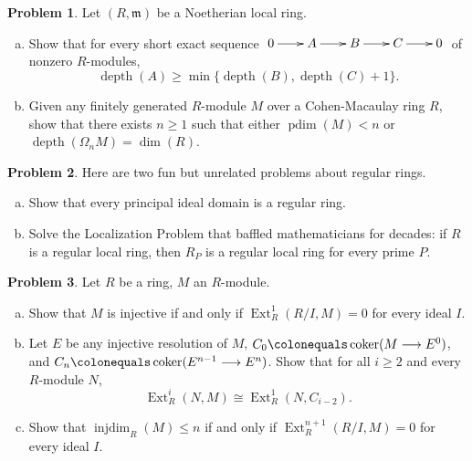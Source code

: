 \documentclass[11pt]{article}
\DeclareMathOperator{\coker}{coker}
\DeclareMathOperator{\Ext}{Ext}
\DeclareMathOperator{\depth}{depth}
\DeclareMathOperator{\pdim}{pdim}
\DeclareMathOperator{\injdim}{inj dim}
\newcommand{\m}{\mathfrak{m}}
\theoremstyle{definition}
\newtheorem{problem}{Problem}
\begin{document}
\begin{problem}
	Let $(R,\m)$ be a Noetherian local ring.
	\begin{enumerate}[a)]
		\item Show that for every short exact sequence $\xymatrix@C=7mm{0 \ar[r] & A \ar[r] & B \ar[r] & C \ar[r] & 0}$ of nonzero $R$-modules,
		$$\depth(A) \geqslant \min \lbrace \depth(B), \depth(C) + 1 \rbrace.$$
		\item Given any finitely generated $R$-module $M$ over a Cohen-Macaulay ring $R$, show that there exists $n \geqslant 1$ such that either $\pdim(M) < n$ or $\depth(\Omega_n M) = \dim(R)$.
	\end{enumerate}
\end{problem}

\vfill

\begin{problem} Here are two fun but unrelated problems about regular rings.
	\begin{enumerate}[a)]
	\item Show that every principal ideal domain is a regular ring.
	\item Solve the Localization Problem that baffled mathematicians for decades: if $R$ is a regular local ring, then $R_P$ is a regular local ring for every prime $P$.
	\end{enumerate}
\end{problem}

\newpage

\begin{problem}
	Let $R$ be a ring, $M$ an $R$-module.
	\begin{enumerate}[a)]
		\item Show that $M$ is injective if and only if $\Ext_R^1(R/I,M) = 0$ for every ideal $I$.
		\item Let $E$ be any injective resolution of $M$, $C_0 \colonequals \coker(M \longrightarrow E^0)$, and $C_n \colonequals \coker(E^{n-1} \longrightarrow E^n)$. Show that for all $i \geqslant 2$ and every $R$-module $N$,
		$$\Ext^i_R(N,M) \cong \Ext^1_R(N,C_{i-2}).$$
		\item Show that $\injdim_R(M) \leqslant n$ if and only if $\Ext_R^{n+1}(R/I,M) = 0$ for every ideal $I$.
	\end{enumerate}
\end{problem}


\
\end{document}
